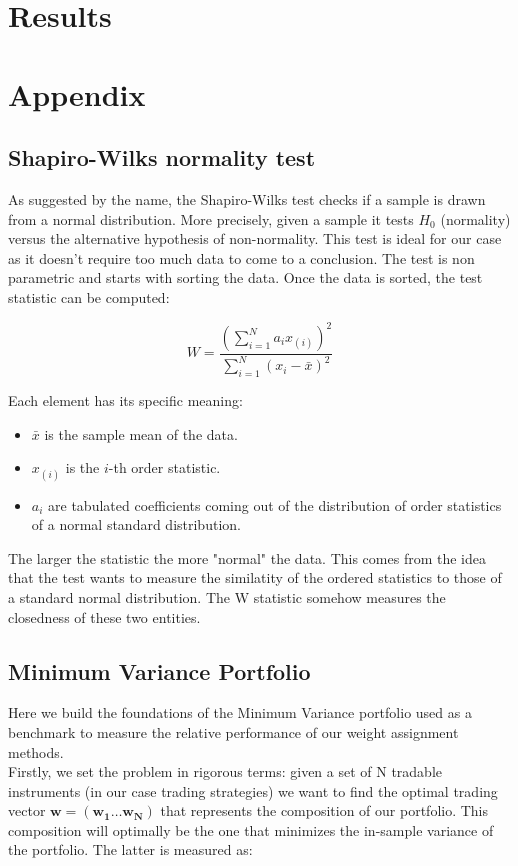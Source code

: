\documentclass[a4paper]{article}
\numberwithin{equation}{subsection}
\begin{document}
\section*{Results}

\section*{Appendix}


\subsection*{Shapiro-Wilks normality test}

As suggested by the name, the Shapiro-Wilks test checks if a sample is drawn from a normal distribution. More precisely, given a sample it tests $H_0$ (normality) versus the alternative hypothesis of non-normality. This test is ideal for our case as it doesn't require too much data to come to a conclusion. The test is non parametric and starts with sorting the data. Once the data is sorted, the test statistic can be computed:

$$
\displaystyle W = \frac{\left(\sum\limits_{i=1}^N a_{i}x_{(i)}\right)^2}{\sum\limits_{i=1}^N(x_i-\bar{x})^2}
$$

Each element has its specific meaning:
\begin{itemize}
	\item $\bar{x}$ is the sample mean of the data.
	\item $x_{(i)}$ is the $i$-th order statistic. 
	\item $a_i$ are tabulated coefficients coming out of the distribution of order statistics of a normal standard distribution.
\end{itemize}

The larger the statistic the more "normal" the data. This comes from the idea that the test wants to measure the similatity of the ordered statistics to those of a standard normal distribution. The W statistic somehow measures the closedness of these two entities.

\subsection*{Minimum Variance Portfolio}

Here we build the foundations of the Minimum Variance portfolio used as a benchmark to measure the relative performance of our weight assignment methods.\\
Firstly, we set the problem in rigorous terms: given a set of N tradable instruments (in our case trading strategies) we want to find the optimal trading vector $\mathbf{w} = (\mathbf{w_1} \dots \mathbf{w_N})$ that represents the composition of our portfolio. This composition will optimally be the one that minimizes the in-sample variance of the portfolio. The latter is measured as:
\end{document}

